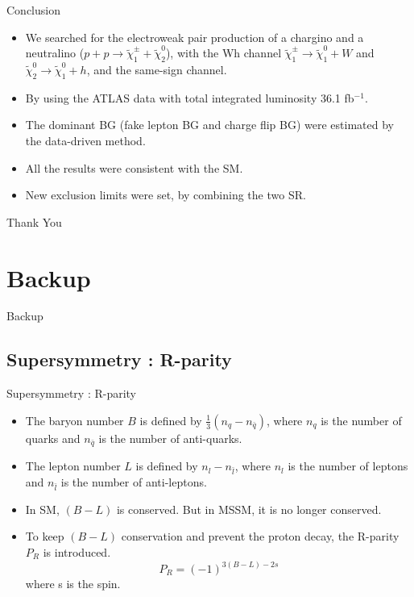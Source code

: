 \documentclass[mathserif,serif]{beamer}
\begin{document}
\begin{frame}{Conclusion}
\begin{itemize}
\item We searched for the electroweak pair production of a chargino and a neutralino
($p + p \rightarrow \tilde{\chi}_1^\pm + \tilde{\chi}_2^0$), with the Wh channel $\tilde{\chi}_1^\pm \rightarrow \tilde{\chi}_1^0 + W$ and $\tilde{\chi}_2^0 \rightarrow \tilde{\chi}_1^0 + h$, and the same-sign channel.
\item By using the ATLAS data with total integrated luminosity 36.1 fb$^{-1}$.
\item The dominant BG (fake lepton BG and charge flip BG) were estimated by the data-driven method.
\item All the results were consistent with the SM.
\item New exclusion limits were set, by combining the two SR.
\end{itemize}
\end{frame}

\begin{frame}
\begin{center}
\huge
Thank You
\end{center}
\end{frame}

\section{Backup}
\begin{frame}
\begin{center}
\huge
Backup
\end{center}
\end{frame}

\subsection{Supersymmetry : R-parity}
\begin{frame}{Supersymmetry : R-parity}
\begin{itemize}
\item The baryon number $B$ is defined by $\frac{1}{3} (n_q - n_{\bar{q}})$, where $n_q$ is the number of quarks and $n_{\bar{q}}$ is the number of anti-quarks.
\item The lepton number $L$ is defined by $n_l - n_{\bar{l}}$, where $n_l$ is the number of leptons and $n_{\bar{l}}$ is the number of anti-leptons.
\item In SM, $(B-L)$ is conserved. But in MSSM, it is no longer conserved.
\item To keep $(B-L)$ conservation and prevent the proton decay, the R-parity $P_R$ is introduced.
\begin{equation*}
P_R = (-1)^{3(B-L)-2s}
\end{equation*}
where s is the spin.
\end{itemize}
\end{frame}
\end{document}
